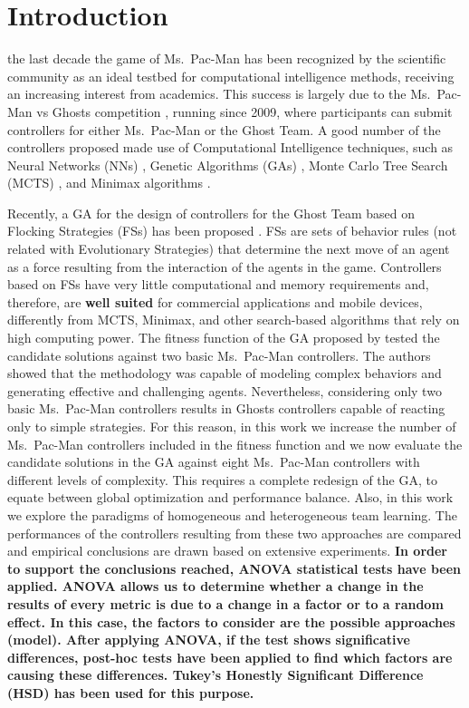 \documentclass[journal]{IEEEtran}
\begin{document}
\section{Introduction}
\label{sec:Introduction}

 the last decade the game of Ms.\  Pac-Man has been recognized by the scientific community as an ideal testbed for computational intelligence methods, receiving an increasing interest from academics. This success is largely due to the Ms.\  Pac-Man vs Ghosts competition \cite{Lucas2009,MsPacManVSGhost2011}, running since 2009, where participants can submit controllers for either Ms.\  Pac-Man or the Ghost Team. A good number of the controllers proposed made use of Computational Intelligence techniques, such as Neural Networks (NNs) \cite{Rojas1996}, Genetic Algorithms (GAs) \cite{Goldberg1988}, Monte Carlo Tree Search (MCTS) \cite{Browne2012}, and Minimax algorithms \cite{Osborne1994}.

Recently, a GA for the design of controllers for the Ghost Team based on Flocking Strategies (FSs) has been proposed \cite{Liberatore2014}. FSs are sets of behavior rules (not related with Evolutionary Strategies) that determine the next move of an agent as a force resulting from the interaction of the agents in the game. Controllers based on FSs have very little computational and memory requirements and, therefore, are \textbf{well suited} for commercial applications and mobile devices, differently from MCTS, Minimax, and other search-based algorithms that rely on high computing power. The fitness function of the GA proposed by \cite{Liberatore2014} tested the candidate solutions against two basic Ms.\  Pac-Man controllers. The authors showed that the methodology was capable of modeling complex behaviors and generating effective and challenging agents. Nevertheless, considering only two basic Ms.\  Pac-Man controllers results in Ghosts controllers capable of reacting only to simple strategies. For this reason, in this work we increase the number of Ms.\  Pac-Man controllers included in the fitness function and we now evaluate the candidate solutions in the GA against eight Ms.\  Pac-Man controllers with different levels of complexity. This requires a complete redesign of the GA, to equate between global optimization and performance balance. Also, in this work we explore the paradigms of homogeneous and heterogeneous team learning. The performances of the controllers resulting from these two approaches are compared and empirical conclusions are drawn based on extensive experiments. \textbf{In order to support the conclusions reached, ANOVA statistical tests \cite{Fisher25,Fisher36} have been applied. ANOVA allows us to determine whether a change in the results of every metric is due to a change in a factor or to a random effect.  In this case, the factors to consider are the possible approaches (model). After applying ANOVA, if the test shows significative differences, post-hoc tests have been applied to find which factors are causing these differences. Tukey’s Honestly Significant Difference (HSD) \cite{Dickinson1971} has been used for this purpose.}
\end{document}
